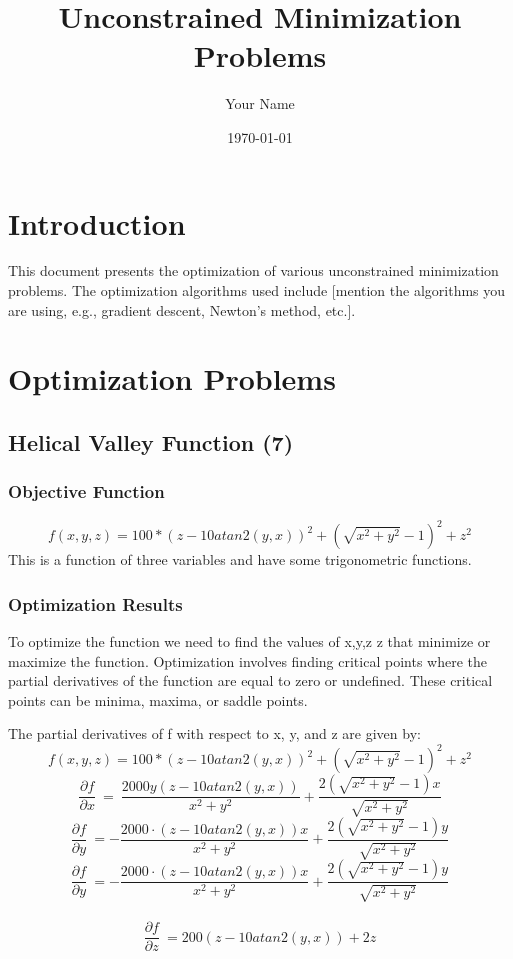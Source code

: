 \documentclass{article}
\title{Unconstrained Minimization Problems}
\author{Your Name}
\date{\today}
\begin{document}
\maketitle

\section*{Introduction}

This document presents the optimization of various unconstrained minimization problems. The optimization algorithms used include [mention the algorithms you are using, e.g., gradient descent, Newton's method, etc.].

\section*{Optimization Problems}

\subsection*{Helical Valley Function (7)}

\subsubsection*{Objective Function}
\[
f(x, y, z) = 100*(z-10atan2(y,x))^2 + (\sqrt{x^2+y^2}-1)^2+z^2 %
\]
This is a function of three variables and have some trigonometric functions.
\subsubsection*{Optimization Results}

To optimize the function we need to find the values of x,y,z
z that minimize or maximize the function. Optimization involves finding critical points where the partial derivatives of the function are equal to zero or undefined. These critical points can be minima, maxima, or saddle points.

The partial derivatives of f with respect to x, y, and z are given by:
$$ f(x,y,z) = 100*(z-10atan2(y,x))^2 + (\sqrt{x^2+y^2}-1)^2+z^2 $$
$$ \frac{\partial f}{\partial x}\:=\:\frac{2000y\left(z-10atan2\left(y,x\right)\right)}{x^2+y^2}+\frac{2\left(\sqrt{x^2+y^2}-1\right)x}{\sqrt{x^2+y^2}}$$
$$ \frac{\partial f}{\partial y}\:=-\frac{2000\cdot \left(z-10atan2\left(y,x\right)\right)x}{x^2+y^2}+\frac{2\left(\sqrt{x^2+y^2}-1\right)y}{\sqrt{x^2+y^2}}$$
$$ \frac{\partial f}{\partial y}\:=-\frac{2000\cdot \left(z-10atan2\left(y,x\right)\right)x}{x^2+y^2}+\frac{2\left(\sqrt{x^2+y^2}-1\right)y}{\sqrt{x^2+y^2}}$$
\\
$$\frac{\partial f}{\partial z}\:=200\left(z-10atan2\left(y,x\right)\right)+2z$$
\end{document}
